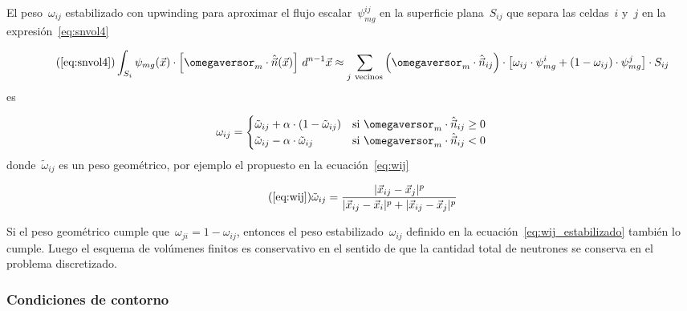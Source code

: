\begin{definicion}
El peso~$\omega_{ij}$ estabilizado con upwinding para aproximar el flujo escalar~$\psi_{mg}^{ij}$ en la superficie plana~$S_{ij}$ que separa las celdas~$i$ y~$j$ en la expresión~\eqref{eq:snvol4}

\begin{equation}\tag{\ref{eq:snvol4}}
 \int_{S_i} \psi_{mg}(\vec{x}) \cdot \left[ \omegaversor_m \cdot \hat{\vec{n}}(\vec{x})\right]  \, d^{n-1}\vec{x}
\approx \sum_{j~\text{vecinos}} \left( \omegaversor_m \cdot \hat{\vec{n}}_{ij}\right) \cdot  \left[ \omega_{ij} \cdot \psi_{mg}^i + (1-\omega_{ij}) \cdot \psi_{mg}^j \right] \cdot S_{ij} 
\end{equation}
%
es

\begin{equation}\label{eq:wij_estabilizado}
 \omega_{ij} =
\begin{cases}
 \tilde{\omega}_{ij} + \alpha \cdot (1 - \tilde{\omega}_{ij}) & \text{si $\omegaversor_m \cdot \hat{\vec{n}}_{ij} \ge 0$}\\
 \tilde{\omega}_{ij} - \alpha \cdot \tilde{\omega}_{ij}       & \text{si $\omegaversor_m \cdot \hat{\vec{n}}_{ij} < 0$}\\
\end{cases}
\end{equation}
%
donde~$\tilde{\omega}_{ij}$ es un peso geométrico, por ejemplo el propuesto en la ecuación~\eqref{eq:wij}
 
\begin{equation}\tag{\ref{eq:wij}}
 \tilde{\omega}_{ij} = \frac{|\vec{x}_{ij} - \vec{x}_j|^p}{|\vec{x}_{ij} - \vec{x}_i|^p + |\vec{x}_{ij} - \vec{x}_j|^p}
\end{equation}

Si el peso geométrico cumple que~$\omega_{ji} = 1-\omega_{ij}$, entonces el peso estabilizado~$\omega_{ij}$ definido en la ecuación~\eqref{eq:wij_estabilizado} también lo cumple. Luego el esquema de volúmenes finitos es conservativo en el sentido de que la cantidad total de neutrones se conserva en el problema discretizado.
\end{definicion}

\subsubsection{Condiciones de contorno} %

